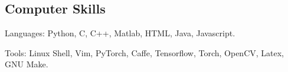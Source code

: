 \documentclass[margin]{res3}
\newenvironment{list1}{
  \begin{list}{\ding{113}}{%
      \setlength{\itemsep}{0.03in}
      \setlength{\parsep}{0in} \setlength{\parskip}{0in}
      \setlength{\topsep}{0in} \setlength{\partopsep}{0in}
      \setlength{\leftmargin}{0in}}}{\end{list}}
\begin{document}
\begin{resume}
\section{\sc Computer Skills}
\begin{list1}

\item[] Languages: Python, C, C++, Matlab, HTML, Java, Javascript.
\item[]	Tools: Linux Shell, Vim, PyTorch, Caffe, Tensorflow, Torch, OpenCV, Latex, GNU Make. 

\end{list1}

\end{resume}
\end{document}
